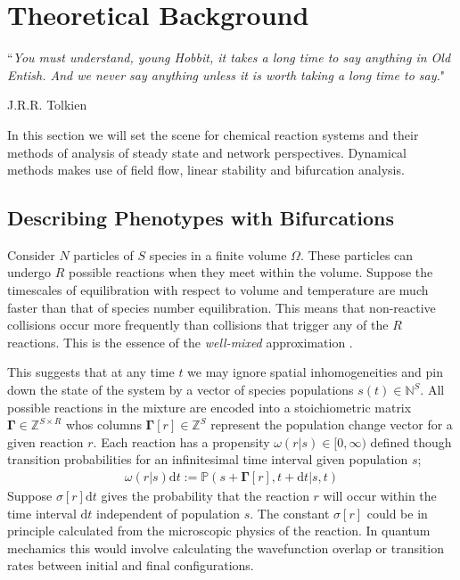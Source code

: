 \chapter{Theoretical Background}
\label{chapter:background}

\epigraph{``\textit{You must understand, young Hobbit, it takes a long time to say anything in Old Entish. And we never say anything unless it is worth taking a long time to say.}"}{J.R.R. Tolkien}
%

In this section we will set the scene for chemical reaction systems and their
methods of analysis of steady state and network perspectives. Dynamical
methods makes use of field flow, linear stability and bifurcation analysis.

\section{Describing Phenotypes with Bifurcations}

Consider $N$ particles of $S$ species in a finite volume $\Omega$. These particles
can undergo $R$ possible reactions when they meet within the volume. Suppose the
timescales of equilibration with respect to volume and temperature are much faster
than that of species number equilibration. This means that non-reactive collisions
occur more frequently than collisions that trigger any of the $R$ reactions. This
is the essence of the \textit{well-mixed} approximation \cite{Gillespie1992}.

This suggests that at any time $t$ we may ignore spatial inhomogeneities and pin
down the state of the system by a vector of species populations $s(t)\in\mathbb{N}^S$.
All possible reactions in the mixture are encoded into a stoichiometric matrix
$\mathbf{\Gamma}\in\mathbb{Z}^{S\times R}$ whos columns $\mathbf{\Gamma}[r]\in\mathbb{Z}^{S}$
represent the population change vector for a given reaction $r$. Each reaction
has a propensity $\omega(r|s)\in[0,\infty)$ defined though transition
probabilities for an infinitesimal time interval given population $s$;
\begin{align}
	\omega(r|s)\mathrm{d}t := \mathbb{P}(s+\mathbf{\Gamma}[r],t+\mathrm{d}t|s,t)
	\label{eq:fundamentalpremise}
\end{align}
Suppose $\sigma[r]\mathrm{d}t$ gives the probability that the reaction $r$
will occur within the time interval $\mathrm{d}t$ independent of population
$s$. The constant $\sigma[r]$ could be in principle calculated from the
microscopic physics of the reaction. In quantum mechamics this would involve
calculating the wavefunction overlap or transition rates between initial and
final configurations.

